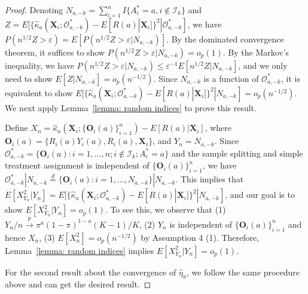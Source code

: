 \documentclass[12pt]{article}
\newcommand{\bX}{\boldsymbol{X}}
\newcommand{\bO}{\boldsymbol{O}}
\begin{document}
\begin{proof}
Denoting $N_{a,-k} = \sum_{i=1}^n I\{A_i^*=a, i \notin \mathcal{I}_k\}$ and $Z= E[\{\widehat{\kappa}_a(\bX_i;\mathcal{O}_{a,-k}^*) - E[R(a)|\bX_i]\}^2|\mathcal{O}^*_{a, -k}]$, we have $P(n^{1/2} Z > \varepsilon)=E[P(n^{1/2} Z > \varepsilon|N_{a,-k})]$. By the dominated convergence theorem, it suffices to show $P(n^{1/2} Z > \varepsilon|N_{a,-k}) = o_p(1)$. By the Markov's inequality, we have $P(n^{1/2} Z > \varepsilon|N_{a,-k}) \le \varepsilon^{-1} E[n^{1/2} Z|N_{a,-k}]$, and we only need to show $E[Z|N_{a,-k}] = o_p(n^{-1/2})$. Since $N_{a,-k}$ is a function of $\mathcal{O}_{a,-k}^*$, it is equivalent to show $E[\{\widehat{\kappa}_a(\bX_i;\mathcal{O}_{a,-k}^*) - E[R(a)|\bX_i]\}^2|N_{a, -k}]= o_p(n^{-1/2})$. We next apply Lemma~\ref{lemma: random indices} to prove this result.

Define $X_n = \widehat{\kappa}_a(\bX_i; \{\bO_i(a)\}_{i=1}^n) - E[R(a)|\bX_i]$, where $\bO_i(a)= \{R_i(a)Y_i(a), R_i(a), \bX_i\}$,  and $Y_n = N_{a,-k}$. Since $\mathcal{O}_{a,-k}^* = \{\bO_i(a): i = 1,\dots, n;i \notin \mathcal{I}_k; A_i^* =a\}$ and the sample splitting and simple treatment assignment is independent of $\{\bO_i(a)\}_{i=1}^n$, we have $\mathcal{O}_{a,-k}^*|N_{a,-k} \overset{d}{=} \{\bO_i(a): i = 1,\dots, N_{a,-k}\}|N_{a,-k}$. This implies that $E[X_{Y_n}^2|Y_n] = E[\{\widehat{\kappa}_a(\bX_i;\mathcal{O}_{a,-k}^*) - E[R(a)|\bX_i]\}^2|N_{a, -k}]$, and our goal is to show $E[X_{Y_n}^2|Y_n] = o_p(1)$. To see this, we observe that (1) $Y_n/n \xrightarrow{p} \pi^a(1-\pi)^{1-a}(K-1)/K$, (2) $Y_n$ is independent of $\{\bO_i(a)\}_{i=1}^n$ and hence $X_n$, (3) $E[X_n^2] = o_p(n^{-1/2})$ by Assumption 4 (1). Therefore, Lemma~\ref{lemma: random indices} implies $E[X_{Y_n}^2|Y_n] = o_p(1)$. 

For the second result about the convergence of $\widehat{\eta}_a$, we follow the same procedure above and can get the desired result.
\end{proof}
\end{document}
